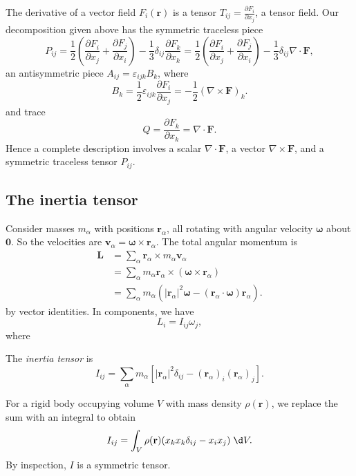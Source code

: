 \documentclass[a4paper]{article}
\begin{document}
\begin{eg}
  The derivative of a vector field $F_i (\mathbf{r})$ is a tensor $T_{ij} = \frac{\partial F_i}{\partial x_j}$, a tensor field. Our decomposition given above has the symmetric traceless piece
  \[
    P_{ij} = \frac{1}{2}\left(\frac{\partial F_i}{\partial x_j} + \frac{\partial F_j}{\partial x_i}\right) - \frac{1}{3}\delta_{ij}\frac{\partial F_k}{\partial x_k} = \frac{1}{2}\left(\frac{\partial F_i}{\partial x_j} + \frac{\partial F_j}{\partial x_i}\right) - \frac{1}{3}\delta_{ij}\nabla\cdot \mathbf{F},
  \]
  an antisymmetric piece $A_{ij} = \varepsilon_{ijk}B_k$, where
  \[
    B_k = \frac{1}{2}\varepsilon_{ijk}\frac{\partial F_i}{\partial x_j} = -\frac{1}{2}(\nabla\times \mathbf{F})_k.
  \]
  and trace
  \[
    Q = \frac{\partial F_k}{\partial x_k} = \nabla \cdot \mathbf{F}.
  \]
  Hence a complete description involves a scalar $\nabla\cdot \mathbf{F}$, a vector $\nabla\times \mathbf{F}$, and a symmetric traceless tensor $P_{ij}$.
\end{eg}

\subsection{The inertia tensor}
Consider masses $m_\alpha$ with positions $\mathbf{r}_\alpha$, all rotating with angular velocity $\boldsymbol\omega$ about $\mathbf{0}$. So the velocities are $\mathbf{v}_\alpha = \boldsymbol\omega\times \mathbf{r}_\alpha$. The total angular momentum is
\begin{align*}
  \mathbf{L} &= \sum_{\alpha} \mathbf{r}_\alpha \times m_\alpha \mathbf{v}_\alpha \\
  &= \sum_\alpha m_\alpha \mathbf{r}_\alpha \times (\boldsymbol\omega\times \mathbf{r}_\alpha)\\
  &= \sum_\alpha m_\alpha( |\mathbf{r}_\alpha|^2\boldsymbol\omega - (\mathbf{r}_\alpha \cdot \boldsymbol\omega)\mathbf{r}_\alpha).
\end{align*}
by vector identities. In components, we have
\[
  L_i = I_{ij}\omega_j,
\]
where
\begin{defi}
  The \emph{inertia tensor} is
  \[
    I_{ij} = \sum_\alpha m_\alpha [|\mathbf{r}_\alpha|^2 \delta_{ij} - (\mathbf{r}_\alpha)_i (\mathbf{r}_\alpha)_j].
  \]
\end{defi}
For a rigid body occupying volume $V$ with mass density $\rho(\mathbf{r})$, we replace the sum with an integral to obtain
\[
  I_{ij} = \int_V \rho (\mathbf{r})(x_kx_k \delta_{ij} - x_i x_j)\;\d V.
\]
By inspection, $I$ is a symmetric tensor.
\end{document}
